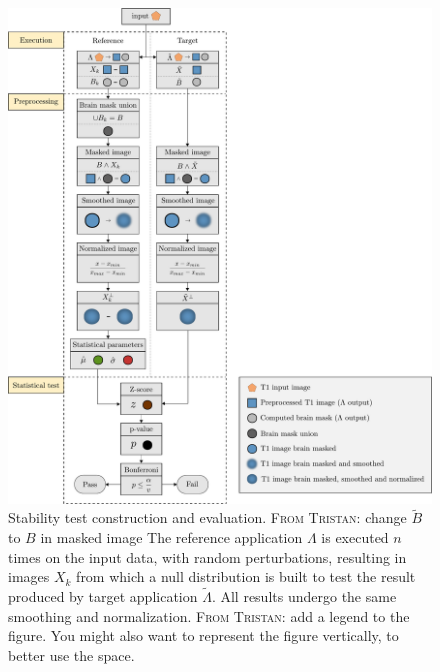 \documentclass[lettersize,journal]{IEEEtran}
\newcommand{\TG}[1]{\color{blue}\textsc{From Tristan:} #1\color{black}\xspace}
\begin{document}
\begin{figure}
    \centering
    \includegraphics[width=\linewidth]{figures/workflow_V.pdf}
    \caption{Stability test construction and evaluation. \TG{change $\tilde B$ to $B$ in masked image} The reference application $\Lambda$ is executed $n$ times on the input data, with random perturbations, resulting in images $X_k$ from which a null distribution is built to test the result produced by target application $\tilde \Lambda$. All results undergo the same smoothing and normalization. \TG{add a legend to the figure. You might also want to represent the figure vertically, to better use the space.}}
    \label{fig:test_workflow}
\end{figure}
\end{document}
